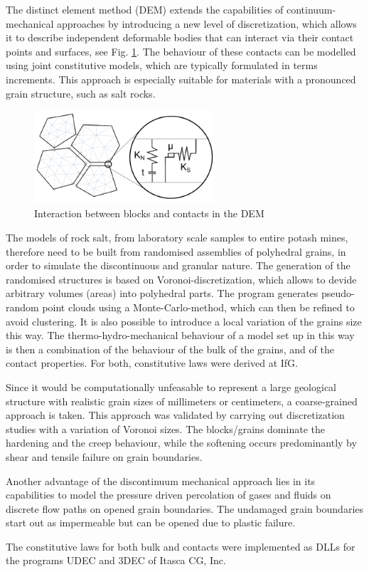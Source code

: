 
The distinct element method (DEM) extends the capabilities of continuum-mechanical approaches by introducing 
a new level of discretization, which allows it to describe independent deformable bodies that can interact 
via their contact points and surfaces, see Fig. \ref{fig:demskizze}. The behaviour of these contacts can be modelled using joint 
constitutive models, which are typically formulated in terms increments. This approach is especially suitable 
for materials with a pronounced grain structure, such as salt rocks. 

\begin{figure}[!ht]
\centering
\includegraphics[width=0.6\textwidth]{figures/skizze.png}
\caption{Interaction between blocks and contacts in the DEM}
\label{fig:demskizze}
\end{figure}

The models of rock salt, from laboratory scale samples to entire potash mines, therefore need to be built from 
randomised assemblies of polyhedral grains, in order to simulate the discontinuous and granular nature. The generation 
of the randomised structures is based on Voronoi-discretization, which allows to devide arbitrary volumes (areas) 
into polyhedral parts. The program generates pseudo-random point clouds using a Monte-Carlo-method, which can 
then be refined to avoid clustering. It is also possible to introduce a local variation of the grains size this way. 
The thermo-hydro-mechanical behaviour of a model set up in this way is then a combination of the behaviour of the 
bulk of the grains, and of the contact properties. For both, constitutive laws were derived at IfG. 

Since it would be computationally unfeasable to represent a large geological structure with realistic grain sizes 
of millimeters or centimeters, a coarse-grained approach is taken. This approach was validated by carrying out 
discretization studies with a variation of Voronoi sizes. The blocks/grains dominate the hardening and the creep 
behaviour, while the softening occurs predominantly by shear and tensile failure on grain boundaries. 

Another advantage of the discontinuum mechanical approach lies in its capabilities to model the pressure driven 
percolation of gases and fluids on discrete flow paths on opened grain boundaries. The undamaged grain boundaries 
start out as impermeable but can be opened due to plastic failure. 

The constitutive laws for both bulk and contacts were implemented as DLLs for the programs UDEC and 3DEC of Itasca CG, 
Inc.
